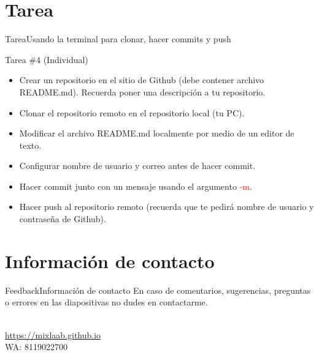 \documentclass[10pt]{beamer}
\newcommand{\chref}[2]{%
  \href{#1}{{\usebeamercolor[bg]{Aalborg}#2}}%
}
\begin{document}
\section{Tarea}
\begin{frame}{Tarea}{Usando la terminal para clonar, hacer commits y push}
\begin{block}{Tarea \#4 (Individual)}
\vspace{0.1in}
\begin{itemize}
    \item Crear un repositorio en el sitio de Github (debe contener archivo README.md). Recuerda poner una descripción a tu repositorio.
    \item Clonar el repositorio remoto en el repositorio local (tu PC).
    \item Modificar el archivo README.md localmente por medio de un editor de texto.
    \item Configurar nombre de usuario y correo antes de hacer commit.
    \item Hacer commit junto con un mensaje usando el argumento \textcolor{red}{-m}.
    \item Hacer push al repositorio remoto (recuerda que te pedirá nombre de usuario y contraseña de Github).
\end{itemize}

\end{block}
\end{frame}

\section{Información de contacto}
\begin{frame}{Feedback}{Información de contacto}
En caso de comentarios, sugerencias, preguntas o errores en las diapositivas no dudes en contactarme.
  \begin{center}
    \insertauthor\\
    \chref{https://mixlaab.github.io}{https://mixlaab.github.io}\\
    WA: 8119022700\\
  \end{center}
\end{frame}

{\aauwavesbg%
\begin{frame}%
\end{frame}}
\end{document}
